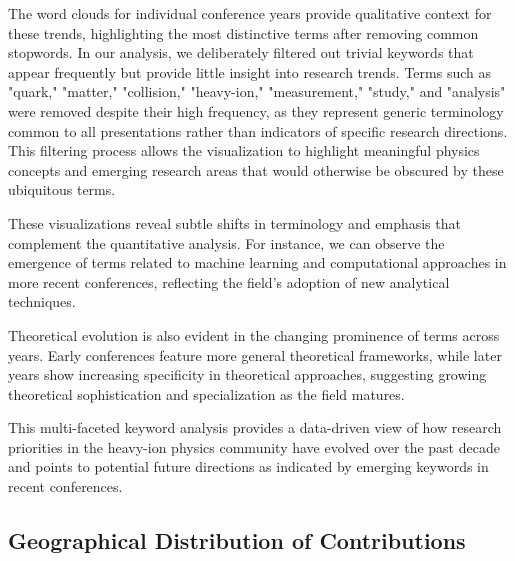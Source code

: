 \documentclass[a4paper,11pt]{article}
\begin{document}
The word clouds for individual conference years provide qualitative context for these trends, highlighting the most distinctive terms after removing common stopwords. In our analysis, we deliberately filtered out trivial keywords that appear frequently but provide little insight into research trends. Terms such as "quark," "matter," "collision," "heavy-ion," "measurement," "study," and "analysis" were removed despite their high frequency, as they represent generic terminology common to all presentations rather than indicators of specific research directions. This filtering process allows the visualization to highlight meaningful physics concepts and emerging research areas that would otherwise be obscured by these ubiquitous terms.

These visualizations reveal subtle shifts in terminology and emphasis that complement the quantitative analysis. For instance, we can observe the emergence of terms related to machine learning and computational approaches in more recent conferences, reflecting the field's adoption of new analytical techniques.

Theoretical evolution is also evident in the changing prominence of terms across years. Early conferences feature more general theoretical frameworks, while later years show increasing specificity in theoretical approaches, suggesting growing theoretical sophistication and specialization as the field matures.

This multi-faceted keyword analysis provides a data-driven view of how research priorities in the heavy-ion physics community have evolved over the past decade and points to potential future directions as indicated by emerging keywords in recent conferences.

\subsection{Geographical Distribution of Contributions}
\end{document}
